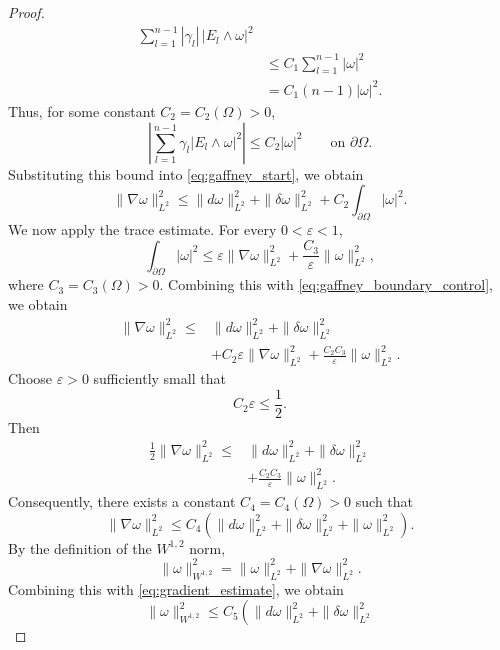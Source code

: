 \begin{proof}
\[\begin{aligned}
    \sum_{l=1}^{n-1}
    |\gamma_l|\,|E_l\wedge\omega|^2\\
&\leq
    C_1\sum_{l=1}^{n-1}|\omega|^2\\
&=
    C_1(n-1)|\omega|^2.
\end{aligned}
\]
Thus, for some constant $C_2=C_2(\Omega)>0$,
\[
    \left|
    \sum_{l=1}^{n-1}
    \gamma_l|E_l\wedge\omega|^2
    \right|
    \leq C_2|\omega|^2
    \qquad\text{on }\partial\Omega.
\]
Substituting this bound into \eqref{eq:gaffney_start}, we obtain
\begin{equation}
\label{eq:gaffney_boundary_control}
    \|\nabla\omega\|_{L^2}^2
    \leq
    \|d\omega\|_{L^2}^2
    +
    \|\delta\omega\|_{L^2}^2
    +
    C_2\int_{\partial\Omega}|\omega|^2.
\end{equation}
We now apply the trace estimate. For every $0<\varepsilon<1$,
\[
    \int_{\partial\Omega}|\omega|^2
    \leq
    \varepsilon\|\nabla\omega\|_{L^2}^2
    +
    \frac{C_3}{\varepsilon}
    \|\omega\|_{L^2}^2,
\]
where $C_3=C_3(\Omega)>0$. Combining this with
\eqref{eq:gaffney_boundary_control}, we obtain
\[
\begin{aligned}
    \|\nabla\omega\|_{L^2}^2
    \leq{}&
    \|d\omega\|_{L^2}^2
    +
    \|\delta\omega\|_{L^2}^2\\
    &+
    C_2\varepsilon\|\nabla\omega\|_{L^2}^2
    +
    \frac{C_2C_3}{\varepsilon}
    \|\omega\|_{L^2}^2.
\end{aligned}
\]
Choose $\varepsilon>0$ sufficiently small that
\[
    C_2\varepsilon\leq\frac12.
\]
Then
\[
\begin{aligned}
    \frac12\|\nabla\omega\|_{L^2}^2
    \leq{}&
    \|d\omega\|_{L^2}^2
    +
    \|\delta\omega\|_{L^2}^2\\
    &+
    \frac{C_2C_3}{\varepsilon}
    \|\omega\|_{L^2}^2.
\end{aligned}
\]
Consequently, there exists a constant $C_4=C_4(\Omega)>0$ such that
\begin{equation}
\label{eq:gradient_estimate}
    \|\nabla\omega\|_{L^2}^2
    \leq
    C_4
    \left(
        \|d\omega\|_{L^2}^2
        +
        \|\delta\omega\|_{L^2}^2
        +
        \|\omega\|_{L^2}^2
    \right).
\end{equation}
By the definition of the $W^{1,2}$ norm,
\[
    \|\omega\|_{W^{1,2}}^2
    =
    \|\omega\|_{L^2}^2
    +
    \|\nabla\omega\|_{L^2}^2.
\]
Combining this with \eqref{eq:gradient_estimate}, we obtain
\[
    \|\omega\|_{W^{1,2}}^2
    \leq
    C_5
    \left(
        \|d\omega\|_{L^2}^2
        +
        \|\delta\omega\|_{L^2}^2
\]
\end{proof}
